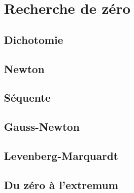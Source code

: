 \section{Recherche de zéro}

\subsection{Dichotomie}
\subsection{Newton}
\subsection{Séquente}
\subsection{Gauss-Newton}
\subsection{Levenberg-Marquardt}
\subsection{Du zéro à l'extremum}